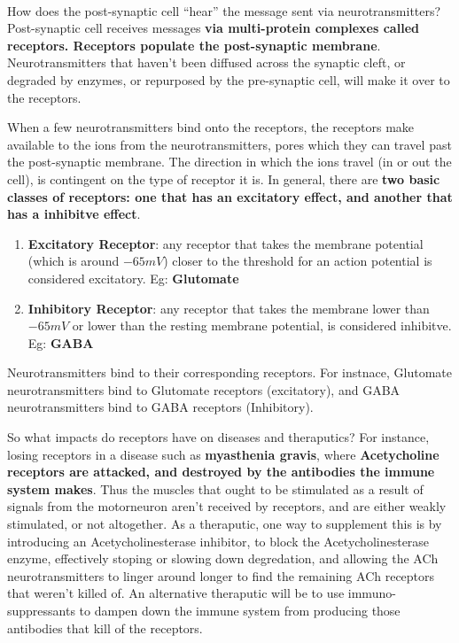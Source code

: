 \documentclass[12pt, a4paper]{article}
\begin{document}
\paragraph*{}
How does the post-synaptic cell ``hear'' the message sent via neurotransmitters?
Post-synaptic cell receives messages \textbf{via multi-protein complexes called receptors.
Receptors populate the post-synaptic membrane}. Neurotransmitters that haven't been diffused across the synaptic cleft,
or degraded by enzymes, or repurposed by the pre-synaptic cell, will make it over to the receptors.

When a few neurotransmitters bind onto the receptors, the receptors make available to the ions from 
the neurotransmitters, pores which they can travel past the post-synaptic membrane. The direction
in which the ions travel (in or out the cell), is contingent on the type of receptor it is.
In general, there are \textbf{two basic classes of receptors: one that has an excitatory effect,
and another that has a inhibitve effect}.

\begin{enumerate}
    \item \textbf{Excitatory Receptor}: any receptor that takes the membrane potential (which is around $-65mV$) closer to the 
    threshold for an action potential is considered excitatory. Eg: \textbf{Glutomate}
    \item  \textbf{Inhibitory Receptor}: any receptor that takes the membrane lower than $-65mV$ or lower than the resting membrane potential,
    is considered inhibitve. Eg: \textbf{GABA}
\end{enumerate}

Neurotransmitters bind to their corresponding receptors. For instnace, Glutomate neurotransmitters bind to 
Glutomate receptors (excitatory), and GABA neurotransmitters bind to GABA receptors (Inhibitory).

So what impacts do receptors have on diseases and theraputics? For instance,
losing receptors in a disease such as \textbf{myasthenia gravis}, where \textbf{Acetycholine receptors
are attacked, and destroyed by the antibodies the immune system makes}. Thus the muscles that ought to be 
stimulated as a result of signals from the motorneuron aren't received by receptors, and are either weakly stimulated, or not
altogether. As a theraputic, one way to supplement this is by introducing an 
Acetycholinesterase inhibitor, to block the Acetycholinesterase enzyme, effectively stoping or slowing down
degredation, and allowing the ACh neurotransmitters to linger around longer to find the remaining ACh receptors that weren't killed of.
An alternative theraputic will be to use immuno-suppressants to dampen down the immune system from producing those
antibodies that kill of the receptors.
\end{document}
